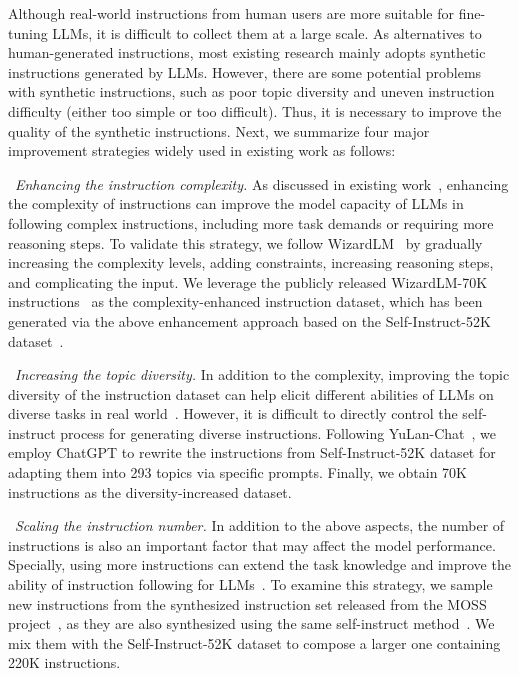  Although real-world instructions from human users are more suitable for fine-tuning LLMs, it is difficult to collect them at a large scale. 
As alternatives to human-generated instructions, most existing research mainly adopts synthetic instructions generated by LLMs.
However, there are some potential  problems with synthetic instructions,  such as poor topic diversity and uneven instruction difficulty (either too simple or too difficult). 
Thus, it is necessary to improve the quality of the synthetic instructions.
Next, we summarize four major improvement strategies widely used in existing work as follows:

\textbullet~\emph{Enhancing the instruction complexity.}
As discussed in existing work~\cite{Xu-arxiv-2023-WizardLM}, enhancing the complexity of instructions can improve the model capacity of LLMs in following complex instructions, %
{\eg including more task demands or requiring more reasoning steps.}
To validate this strategy, we follow WizardLM~\cite{Xu-arxiv-2023-WizardLM} by gradually increasing the complexity levels, \eg adding constraints, increasing reasoning steps, and complicating the input. 
{We leverage the publicly released WizardLM-70K instructions~\cite{Xu-arxiv-2023-WizardLM} as the complexity-enhanced instruction dataset, which has been generated via the above enhancement approach based on the Self-Instruct-52K dataset~\cite{Xu-arxiv-2023-WizardLM}.}

\textbullet~\emph{Increasing the topic diversity.}
In addition to the complexity, 
improving the topic diversity of the instruction dataset  %
{can help elicit different abilities of LLMs on  diverse tasks in real world~\cite{Sun-arxiv-2023-Principle}.}
However,  it is difficult to directly control the self-instruct process for generating diverse instructions. Following YuLan-Chat~\cite{YuLan-Chat}, we employ ChatGPT to rewrite the instructions from Self-Instruct-52K dataset for adapting them into 293 topics via specific prompts.
Finally, we obtain 70K instructions as the diversity-increased dataset.

\textbullet~\emph{Scaling the instruction number.}
In addition to the above aspects, the number of instructions is also an important factor that may affect the model performance.
Specially, using more instructions can extend the task knowledge and improve the ability of instruction following for LLMs~\cite{Chung-arxiv-2022-Scaling}. 
To examine this strategy, we sample new instructions from the synthesized instruction set released from the MOSS project~\cite{sun2023moss}, {as they are also synthesized using the same self-instruct method~\cite{Wang-arXiv-2022-Self}.}
We mix them with the Self-Instruct-52K dataset to compose a larger one containing 220K instructions. 

